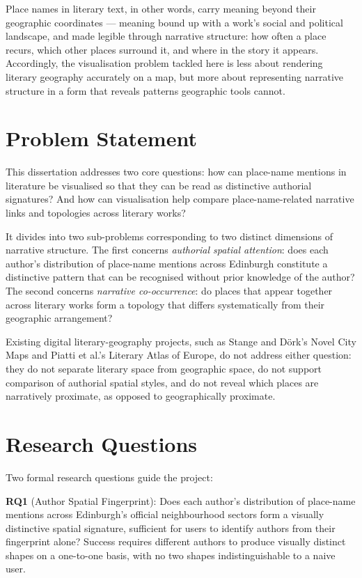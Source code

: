 \documentclass[logo,msc]{infthesis}
\begin{document}
Place names in literary text, in other words, carry meaning beyond their geographic coordinates — meaning bound up with a work's social and political landscape, and made legible through narrative structure: how often a place recurs, which other places surround it, and where in the story it appears. Accordingly, the visualisation problem tackled here is less about rendering literary geography accurately on a map, but more about representing narrative structure in a form that reveals patterns geographic tools cannot.
 
\section{Problem Statement}
 
This dissertation addresses two core questions: how can place-name mentions in literature be visualised so that they can be read as distinctive authorial signatures? And how can visualisation help compare place-name-related narrative links and topologies across literary works?
 
It divides into two sub-problems corresponding to two distinct dimensions of narrative structure. The first concerns \emph{authorial spatial attention}: does each author's distribution of place-name mentions across Edinburgh constitute a distinctive pattern that can be recognised without prior knowledge of the author? The second concerns \emph{narrative co-occurrence}: do places that appear together across literary works form a topology that differs systematically from their geographic arrangement?
 
Existing digital literary-geography projects, such as Stange and Dörk's Novel City Maps and Piatti et al.'s Literary Atlas of Europe, do not address either question: they do not separate literary space from geographic space, do not support comparison of authorial spatial styles, and do not reveal which places are narratively proximate, as opposed to geographically proximate.
 
\section{Research Questions}
 
Two formal research questions guide the project:
 
\textbf{RQ1} (Author Spatial Fingerprint): Does each author's distribution of place-name mentions across Edinburgh's official neighbourhood sectors form a visually distinctive spatial signature, sufficient for users to identify authors from their fingerprint alone? Success requires different authors to produce visually distinct shapes on a one-to-one basis, with no two shapes indistinguishable to a naive user.
 
\end{document}
